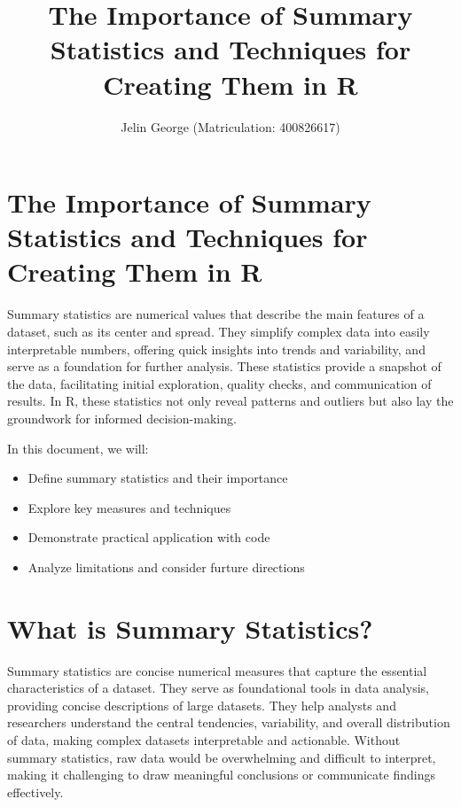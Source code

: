 \documentclass[
  man,
  floatsintext,
  longtable,
  nolmodern,
  notxfonts,
  notimes,
  colorlinks=true,linkcolor=blue,citecolor=blue,urlcolor=blue]{apa7}
\title{The Importance of Summary Statistics and Techniques for Creating
Them in R}
\author{Jelin George (Matriculation: 400826617)}
\affiliation{
{Hochschule Fresenius - University of Applied Science}}
\begin{document}
\maketitle

\hypertarget{toc}{}
\tableofcontents
\newpage
\section[Introduction]{The Importance of Summary Statistics and
Techniques for Creating Them in R}

\setcounter{secnumdepth}{-\maxdimen} %

\setlength\LTleft{0pt}


Summary statistics are numerical values that describe the main features
of a dataset, such as its center and spread. They simplify complex data
into easily interpretable numbers, offering quick insights into trends
and variability, and serve as a foundation for further analysis. These
statistics provide a snapshot of the data, facilitating initial
exploration, quality checks, and communication of results. In R, these
statistics not only reveal patterns and outliers but also lay the
groundwork for informed decision-making.

In this document, we will:

\begin{itemize}
\item
  Define summary statistics and their importance
\item
  Explore key measures and techniques
\item
  Demonstrate practical application with code
\item
  Analyze limitations and consider furture directions
\end{itemize}

\newpage

\section{What is Summary Statistics?}\label{what-is-summary-statistics}

Summary statistics are concise numerical measures that capture the
essential characteristics of a dataset. They serve as foundational tools
in data analysis, providing concise descriptions of large datasets. They
help analysts and researchers understand the central tendencies,
variability, and overall distribution of data, making complex datasets
interpretable and actionable. Without summary statistics, raw data would
be overwhelming and difficult to interpret, making it challenging to
draw meaningful conclusions or communicate findings effectively.
\end{document}
